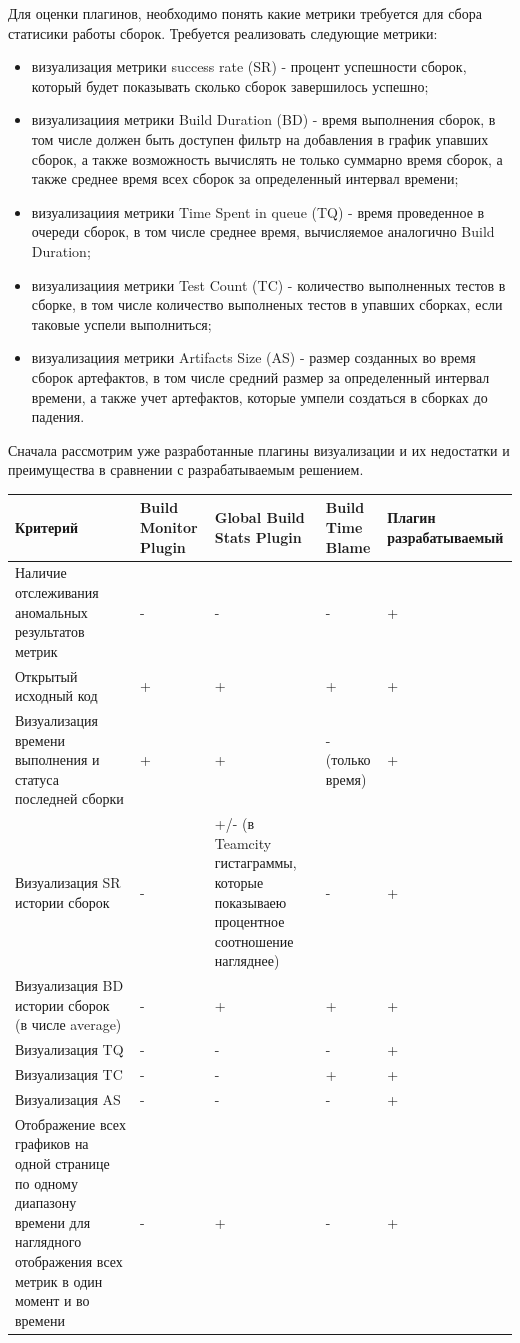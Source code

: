 Для оценки плагинов, необходимо понять какие метрики требуется для сбора статисики работы сборок. Требуется реализовать следующие метрики:

\begin{itemize}
	\item визуализация метрики success rate (SR) - процент успешности сборок, который будет показывать сколько сборок завершилось успешно;
	\item визуализациия метрики Build Duration (BD) - время выполнения сборок, в том числе должен быть доступен фильтр на добавления в график упавших сборок, а также возможность вычислять не только суммарно время сборок, а также среднее время всех сборок за определенный интервал времени;
	\item визуализациия метрики Time Spent in queue (TQ) - время проведенное в очереди сборок, в том числе среднее время, вычисляемое аналогично Build Duration;
	\item  визуализациия метрики Test Count (TC) - количество выполненных тестов в сборке, в том числе количество выполненых тестов в упавших сборках, если таковые успели выполниться;
	\item визуализациия метрики Artifacts Size (AS) - размер созданных во время сборок артефактов, в том числе средний размер за определенный интервал времени, а также учет артефактов, которые умпели создаться в сборках до падения.
\end{itemize}

Сначала рассмотрим уже разработанные плагины визуализации и их недостатки и преимущества в сравнении с разрабатываемым решением.

\begin{table}
    \centering
    \begin{tabular}{|p{5cm}|p{2cm}|p{3cm}|p{3cm}|p{2cm}|}
    \hline
        Критерий & Build Monitor Plugin & Global Build Stats Plugin  & Build Time Blame & Плагин разрабатываемый  \\ \hline
        Наличие отслеживания аномальных результатов метрик  & - & - & - & +  \\ \hline
        Открытый исходный код  & + &+ & + & +  \\ \hline
        Визуализация времени выполнения и статуса последней сборки & + &+ & - (только время) &+  \\ \hline
        Визуализация SR истории сборок & - & +/- (в Teamcity гистаграммы, которые показываею процентное соотношение нагляднее) & - & +  \\ \hline
       Визуализация BD истории сборок (в числе average) & - & + & +  & +  \\ \hline
       Визуализация TQ & - & - & -  &+  \\ \hline
      Визуализация TC & - & - & +  & +  \\ \hline
      Визуализация AS & - &- &-  & +  \\ \hline
       Отображение всех графиков на одной странице по одному диапазону времени для наглядного отображения всех метрик в один момент и во времени & - & + & -  & +  \\ \hline


    \end{tabular}
\end{table}	

